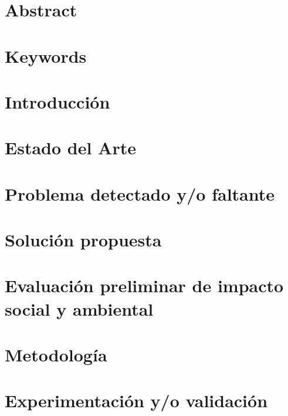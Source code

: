 \documentclass[a4paper,11pt]{article}
\begin{document}
\section{Abstract}

\newpage

\section{Keywords}

\newpage

\section{Introducción}

\newpage

\section{Estado del Arte}

\newpage

\section{Problema detectado y/o faltante}

\newpage

\section{Solución propuesta}

\newpage

\section{Evaluación preliminar de impacto social y ambiental}

\newpage

\section{Metodología}

\newpage

\section{Experimentación y/o validación}

\newpage
\end{document}
